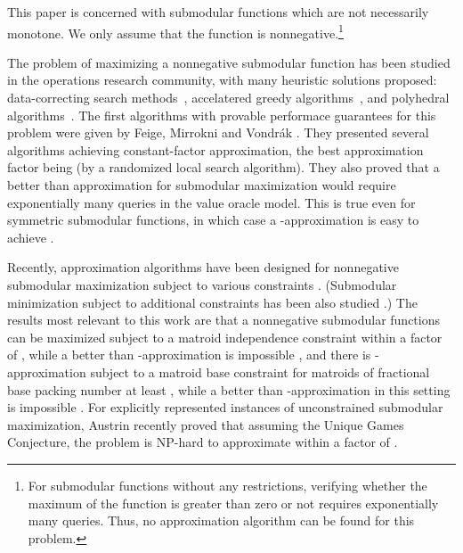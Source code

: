 \documentclass{article}[11pt]
\begin{document}
This paper is concerned with submodular functions which are not necessarily monotone.
We only assume that the function is nonnegative.\footnote{For submodular
functions without any restrictions, verifying whether the maximum
of the function is greater than zero or not requires exponentially many queries.
Thus, no approximation algorithm can be found for this problem.}
\iffalse 
In this setting, the maximization problem is computationally hard even without any constraint,
since it captures for example the Max Cut problem.
Typical examples of such a problem are Max Cut and Max Directed Cut.
Here, the best approximation factors have been achieved using
semidefinite programming:  for Max Cut~\cite{GW95} and
 for Max Di-Cut~\cite{FG95,LLZ02}. The approximation factor for
Max Cut has been proved optimal, assuming the Unique Games
Conjecture~\cite{KKMO04,MOO05}. An algorithm for Max Cut based on eigenvalue computations
rather than SDP is also known to beat the factor of  \cite{Trevisan08}.
However, purely combinatorial algorithms for Max Cut and Max Di-Cut are known to
achieve only a -approximation \cite{HZ01}.
\fi
The problem of maximizing a nonnegative submodular function has been studied
in the operations research community, with many heuristic solutions proposed:
data-correcting search methods~\cite{GSTT99,GTT99,K89}, accelatered greedy algorithms~\cite{RS89},
and polyhedral algorithms~\cite{LNW96}.
The first algorithms with provable performace guarantees for this problem were given 
by Feige, Mirrokni and Vondr\'ak \cite{FMV07}. They presented several algorithms achieving
constant-factor approximation, the best approximation factor being 
 (by a randomized local search algorithm).
They also proved that a better than  approximation for submodular maximization
would require exponentially many queries in the value oracle model.
This is true even for symmetric submodular functions, in which case a
-approximation is easy to achieve \cite{FMV07}.

Recently, approximation algorithms have been designed for nonnegative
submodular maximization subject to various constraints \cite{LMNS09,LSV09,Vondrak09,GRST10}.
(Submodular minimization subject to additional constraints has been
also studied \cite{SF08,GKTW09,IN09}.)
The results most relevant to this work are that a nonnegative submodular functions can be
maximized subject to a matroid independence constraint within a factor of ,
while a better than -approximation is impossible \cite{Vondrak09},
and there is -approximation subject to
a matroid base constraint for matroids of fractional
base packing number at least , while a better
than -approximation in this setting is impossible \cite{Vondrak09}.
For explicitly represented instances of unconstrained submodular maximization,
Austrin \cite{Austrin10} recently proved that assuming the Unique Games Conjecture,
the problem is NP-hard to approximate within a factor of . 
\end{document}
